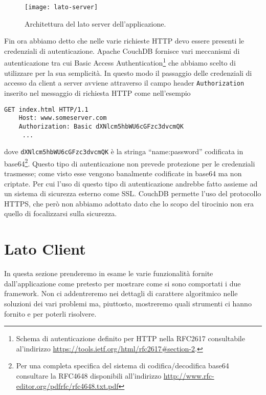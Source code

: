         \begin{figure}[h]
            \centering
            \texttt{[image: lato-server]}
            \caption{
                Architettura del lato server dell'applicazione.
            }
            \label{fig:latoserver}
        \end{figure}

        Fin ora abbiamo detto che nelle varie richieste HTTP devo essere presenti
        le credenziali di autenticazione. Apache CouchDB\texttrademark{} fornisce
        vari meccanismi di autenticazione tra cui Basic Access Authentication\footnote{
        Schema di autenticazione definito per HTTP nella RFC2617 consultabile al'indirizzo
        \url{https://tools.ietf.org/html/rfc2617\#section-2}.}
        che abbiamo scelto di utilizzare per la sua semplicità. In questo modo il
        passaggio delle credenziali di accesso da client a server avviene attraverso
        il campo header \texttt{Authorization} inserito nel messaggio di richiesta HTTP
        come nell'esempio
        \begin{lstlisting}[language=http]
    GET index.html HTTP/1.1
    Host: www.someserver.com
    Authorization: Basic dXNlcm5hbWU6cGFzc3dvcmQK
     ...
        \end{lstlisting}
        dove \texttt{dXNlcm5hbWU6cGFzc3dvcmQK} è la stringa ``name:password''
        codificata in base64\footnote{Per una completa specifica del sistema di
        codifica/decodifica base64 consultare la RFC4648 disponibili all'indirizzo
        \url{http://www.rfc-editor.org/pdfrfc/rfc4648.txt.pdf}}.
        Questo tipo di autenticazione non prevede protezione per le credenziali
        trasmesse; come visto esse vengono banalmente codificate in base64 ma non
        criptate. Per cui l'uso di questo tipo di
        autenticazione andrebbe fatto assieme ad un sistema di sicurezza esterno
        come SSL\citep{Web:RFC2617}. CouchDB permette l'uso del protocollo HTTPS,
        che però non abbiamo adottato dato che lo scopo del tirocinio non era quello di focalizzarsi
        sulla sicurezza.


    \section{Lato Client}
        In questa sezione prenderemo in esame le varie funzionalità fornite
        dall'applicazione come pretesto per mostrare come si sono
        comportati i due framework. Non ci addentreremo
        nei dettagli di carattere algoritmico nelle soluzioni dei vari problemi ma,
        piuttosto, mostreremo quali strumenti ci hanno fornito \tisdk{} e \pg{}
        per poterli risolvere.

